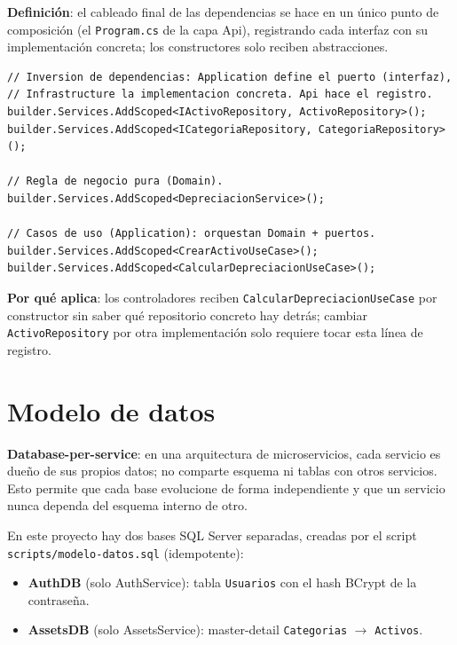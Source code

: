 \documentclass[11pt,a4paper]{article}
\begin{document}
\textbf{Definición}: el cableado final de las dependencias se hace en un único
punto de composición (el \texttt{Program.cs} de la capa Api), registrando cada
interfaz con su implementación concreta; los constructores solo reciben
abstracciones.

\begin{lstlisting}[style=csharp, caption={AssetsService.Api/Program.cs (fragmento)}]
// Inversion de dependencias: Application define el puerto (interfaz),
// Infrastructure la implementacion concreta. Api hace el registro.
builder.Services.AddScoped<IActivoRepository, ActivoRepository>();
builder.Services.AddScoped<ICategoriaRepository, CategoriaRepository>();

// Regla de negocio pura (Domain).
builder.Services.AddScoped<DepreciacionService>();

// Casos de uso (Application): orquestan Domain + puertos.
builder.Services.AddScoped<CrearActivoUseCase>();
builder.Services.AddScoped<CalcularDepreciacionUseCase>();
\end{lstlisting}

\textbf{Por qué aplica}: los controladores reciben \texttt{CalcularDepreciacionUseCase}
por constructor sin saber qué repositorio concreto hay detrás; cambiar
\texttt{ActivoRepository} por otra implementación solo requiere tocar esta
línea de registro.

\section{Modelo de datos}

\textbf{Database-per-service}: en una arquitectura de microservicios, cada
servicio es dueño de sus propios datos; no comparte esquema ni tablas con
otros servicios. Esto permite que cada base evolucione de forma independiente
y que un servicio nunca dependa del esquema interno de otro.

En este proyecto hay dos bases SQL Server separadas, creadas por el script
\texttt{scripts/modelo-datos.sql} (idempotente):

\begin{itemize}
    \item \textbf{AuthDB} (solo AuthService): tabla \texttt{Usuarios} con el
    hash BCrypt de la contraseña.
    \item \textbf{AssetsDB} (solo AssetsService): master-detail
    \texttt{Categorias} $\rightarrow$ \texttt{Activos}.
\end{itemize}
\end{document}
